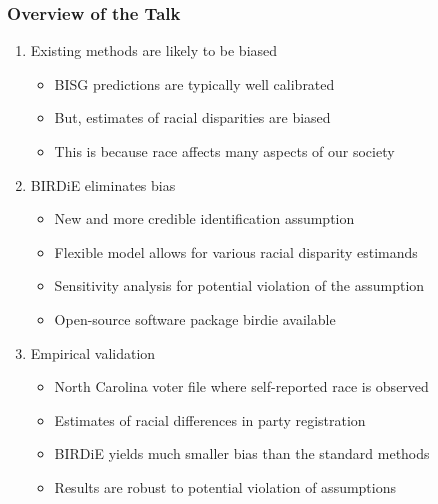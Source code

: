\documentclass[handout]{beamer}
\begin{document}
\begin{frame}

  \frametitle{Overview of the Talk}

  \begin{enumerate}
  \item Existing methods are likely to be biased
    \begin{itemize}
    \item BISG predictions are typically well calibrated
    \item But, estimates of racial disparities are biased
    \item This is because race affects many aspects of our society
    \end{itemize}
    \vfill
  \item \alert{BIRDiE} eliminates bias
    \begin{itemize}
    \item New and more credible identification assumption
    \item Flexible model allows for various racial disparity estimands
    \item Sensitivity analysis for potential violation of the
      assumption
    \item Open-source software package \alert{birdie} available
    \end{itemize}
    \vfill
  \item Empirical validation
    \begin{itemize}
    \item North Carolina voter file where self-reported race is
      observed
    \item Estimates of racial differences in party registration
    \item BIRDiE yields much smaller bias than the standard methods
    \item Results are robust to potential violation of assumptions
    \end{itemize}
  \end{enumerate}

\end{frame}
\end{document}
